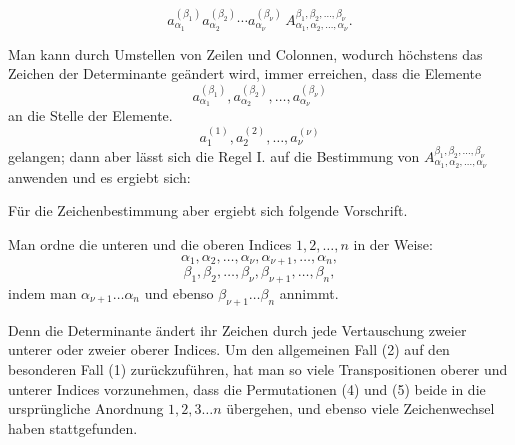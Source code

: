 
\begin{equation}
        a_{\alpha_1}^{(\beta_1)}a_{\alpha_2}^{(\beta_2)}\cdots a_{\alpha_\nu}^{(\beta_\nu)}\,
        A_{\alpha_1,\alpha_2,\ldots,\alpha_\nu}^{\beta_1,\beta_2,\ldots,\beta_\nu}.
\tag{2}
\end{equation}

Man kann durch Umstellen von Zeilen und Colonnen, wodurch höchstens das Zeichen der Determinante geändert wird, immer erreichen, dass die Elemente
\begin{equation}
        a_{\alpha_1}^{(\beta_1)},
        a_{\alpha_2}^{(\beta_2)},\ldots,
        a_{\alpha_\nu}^{(\beta_\nu)}
\tag{3}
\end{equation}
an die Stelle der Elemente. %
\[
        a_1^{(1)},a_2^{(2)},\ldots,a_\nu^{(\nu)}
\]
gelangen; dann aber lässt sich die Regel I. auf die Bestimmung von \(A_{\alpha_1,\alpha_2,\ldots,\alpha_\nu}^{\beta_1,\beta_2,\ldots,\beta_\nu}\) anwenden und es ergiebt sich:


Für die Zeichenbestimmung aber ergiebt sich folgende Vorschrift.

Man ordne die unteren und die oberen Indices \(1,2,\ldots,n\) in der Weise:
\begin{equation}
        \alpha_1,\alpha_2,\ldots,\alpha_\nu,\alpha_{\nu+1},\ldots,\alpha_n,
\tag{4}
\end{equation}
\begin{equation}
        \beta_1,\beta_2,\ldots,\beta_\nu,\beta_{\nu+1},\ldots,\beta_n,
\tag{5}
\end{equation}
indem man \(\alpha_{\nu+1}\ldots\alpha_n\) und ebenso \(\beta_{\nu+1}\ldots\beta_n\)  annimmt.


Denn die Determinante ändert ihr Zeichen durch jede Vertauschung zweier unterer oder zweier oberer Indices. Um den allgemeinen Fall (2) auf den besonderen Fall (1) zurückzuführen, hat man so viele Transpositionen oberer und unterer Indices vorzunehmen, dass die Permutationen (4) und (5) beide in die ursprüngliche Anordnung \(1,2,3\ldots n\) übergehen, und ebenso viele Zeichenwechsel haben stattgefunden.
